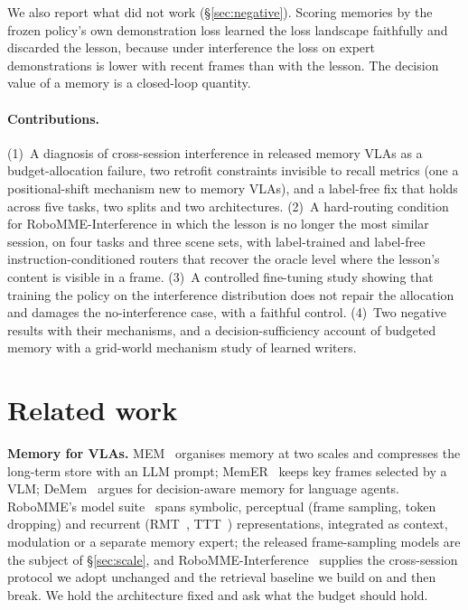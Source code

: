 \documentclass{article}
\begin{document}
We also report what did not work (\S\ref{sec:negative}). Scoring memories by the frozen policy's own demonstration loss learned the loss landscape faithfully and discarded the lesson, because under interference the loss on expert demonstrations is lower with recent frames than with the lesson. The decision value of a memory is a closed-loop quantity.

\paragraph{Contributions.} (1)~A diagnosis of cross-session interference in released memory VLAs as a budget-allocation failure, two retrofit constraints invisible to recall metrics (one a positional-shift mechanism new to memory VLAs), and a label-free fix that holds across five tasks, two splits and two architectures. (2)~A hard-routing condition for RoboMME-Interference in which the lesson is no longer the most similar session, on four tasks and three scene sets, with label-trained and label-free instruction-conditioned routers that recover the oracle level where the lesson's content is visible in a frame. (3)~A controlled fine-tuning study showing that training the policy on the interference distribution does not repair the allocation and damages the no-interference case, with a faithful control. (4)~Two negative results with their mechanisms, and a decision-sufficiency account of budgeted memory with a grid-world mechanism study of learned writers.

\section{Related work}
\label{sec:related}

\textbf{Memory for VLAs.} MEM~\cite{mem} organises memory at two scales and compresses the long-term store with an LLM prompt; MemER~\cite{memer} keeps key frames selected by a VLM; DeMem~\cite{demem} argues for decision-aware memory for language agents. RoboMME's model suite~\cite{robomme} spans symbolic, perceptual (frame sampling, token dropping) and recurrent (RMT~\cite{rmt}, TTT~\cite{ttt}) representations, integrated as context, modulation or a separate memory expert; the released frame-sampling models are the subject of \S\ref{sec:scale}, and RoboMME-Interference~\cite{robomme_interference} supplies the cross-session protocol we adopt unchanged and the retrieval baseline we build on and then break. We hold the architecture fixed and ask what the budget should hold.
\end{document}
